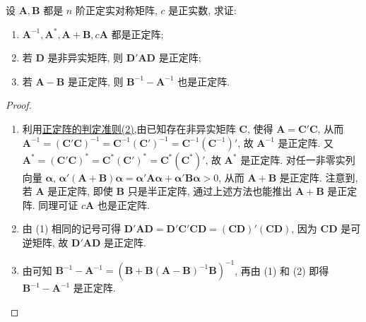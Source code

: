 \documentclass[../../main.tex]{subfiles}%
\begin{document}
\begin{proposition}\label{proposition:正定阵的性质123}
设 \(\boldsymbol{A},\boldsymbol{B}\) 都是 \(n\) 阶正定实对称矩阵, \(c\) 是正实数, 求证:
\begin{enumerate}[(1)]
\item \(\boldsymbol{A}^{-1},\boldsymbol{A}^*,\boldsymbol{A}+\boldsymbol{B},c\boldsymbol{A}\) 都是正定阵;
\item 若 \(\boldsymbol{D}\) 是非异实矩阵, 则 \(\boldsymbol{D}'\boldsymbol{A}\boldsymbol{D}\) 是正定阵;
\item 若 \(\boldsymbol{A}-\boldsymbol{B}\) 是正定阵, 则 \(\boldsymbol{B}^{-1}-\boldsymbol{A}^{-1}\) 也是正定阵.
\end{enumerate}
\end{proposition}
\begin{proof}
\begin{enumerate}[(1)]
\item 利用\hyperref[theorem:正定阵的判定准则]{正定阵的判定准则(2)},由已知存在非异实矩阵 \(\boldsymbol{C}\), 使得 \(\boldsymbol{A}=\boldsymbol{C}'\boldsymbol{C}\), 从而 \(\boldsymbol{A}^{-1}=(\boldsymbol{C}'\boldsymbol{C})^{-1}=\boldsymbol{C}^{-1}(\boldsymbol{C}')^{-1}=\boldsymbol{C}^{-1}(\boldsymbol{C}^{-1})'\), 故 \(\boldsymbol{A}^{-1}\) 是正定阵. 又 \(\boldsymbol{A}^*=(\boldsymbol{C}'\boldsymbol{C})^*=\boldsymbol{C}^*(\boldsymbol{C}')^*=\boldsymbol{C}^*(\boldsymbol{C}^*)'\), 故 \(\boldsymbol{A}^*\) 是正定阵. 对任一非零实列向量 \(\boldsymbol{\alpha}\), \(\boldsymbol{\alpha}'(\boldsymbol{A}+\boldsymbol{B})\boldsymbol{\alpha}=\boldsymbol{\alpha}'\boldsymbol{A}\boldsymbol{\alpha}+\boldsymbol{\alpha}'\boldsymbol{B}\boldsymbol{\alpha}>0\), 从而 \(\boldsymbol{A}+\boldsymbol{B}\) 是正定阵. 注意到, 若 \(\boldsymbol{A}\) 是正定阵, 即使 \(\boldsymbol{B}\) 只是半正定阵, 通过上述方法也能推出 \(\boldsymbol{A}+\boldsymbol{B}\) 是正定阵. 同理可证 \(c\boldsymbol{A}\) 也是正定阵.
\item 由 (1) 相同的记号可得 \(\boldsymbol{D}'\boldsymbol{A}\boldsymbol{D}=\boldsymbol{D}'\boldsymbol{C}'\boldsymbol{C}\boldsymbol{D}=(\boldsymbol{C}\boldsymbol{D})'(\boldsymbol{C}\boldsymbol{D})\), 因为 \(\boldsymbol{C}\boldsymbol{D}\) 是可逆矩阵, 故 \(\boldsymbol{D}'\boldsymbol{A}\boldsymbol{D}\) 是正定阵. 
\item 由可知 \(\boldsymbol{B}^{-1}-\boldsymbol{A}^{-1}=(\boldsymbol{B}+\boldsymbol{B}(\boldsymbol{A}-\boldsymbol{B})^{-1}\boldsymbol{B})^{-1}\), 再由 (1) 和 (2) 即得 \(\boldsymbol{B}^{-1}-\boldsymbol{A}^{-1}\) 是正定阵. 
\end{enumerate}
\end{proof}
\end{document}
